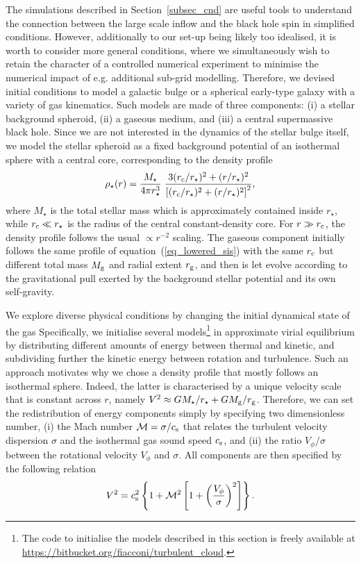 \documentclass[a4paper,fleqn,usenatbib]{mnras}
\begin{document}

The simulations described in Section~\ref{subsec_cnd} are useful tools to understand the connection between the large scale inflow and the black hole spin in simplified conditions.
However, additionally to our set-up being likely too idealised, it is worth to consider more general conditions, where we simultaneously wish to retain the character of a controlled numerical experiment to minimise the numerical impact of e.g. additional sub-grid modelling.
Therefore, we devised initial conditions to model a galactic bulge or a spherical early-type galaxy with a variety of gas kinematics. 
Such models are made of three components: (i) a stellar background spheroid, (ii) a gaseous medium, and (iii) a central supermassive black hole.
Since we are not interested in the dynamics of the stellar bulge itself, we model the stellar spheroid as a fixed background potential of an isothermal sphere with a central core, corresponding to the density profile
\begin{equation}\label{eq_lowered_sis}
\rho_{\star}(r) = \frac{M_{\star}}{4 \pi r_{\star}^3}~\frac{3 (r_{\rm c}/r_{\star})^2 + (r/r_{\star})^2}{\left[(r_{\rm c}/r_{\star})^2 + (r/r_{\star})^2 \right]^2},
\end{equation}
where $M_{\star}$ is the total stellar mass which is approximately contained inside $r_{\star}$, while $r_{\rm c} \ll r_{\star}$ is the radius of the central constant-density core.
For $r \gg r_{\rm c}$, the density profile follows the usual $\propto r^{-2}$ scaling.
The gaseous component initially follows the same profile of equation~(\ref{eq_lowered_sis}) with the same $r_{\rm c}$ but different total mass $M_{\rm g}$ and radial extent $r_{\rm g}$, and then is let evolve according to the gravitational pull exerted by the background stellar potential and its own self-gravity.

We explore diverse physical conditions by changing the initial dynamical state of the gas
Specifically, we initialise several models\footnote{The code to initialise the models described in this section is freely available at \url{https://bitbucket.org/fiacconi/turbulent_cloud}.} in approximate virial equilibrium by distributing different amounts of energy between thermal and kinetic, and subdividing further the kinetic energy between rotation and turbulence.
Such an approach motivates why we chose a density profile that mostly follows an isothermal sphere.
Indeed, the latter is characterised by a unique velocity scale that is constant across $r$, namely $V^2 \approx GM_{\star}/r_{\star} + G M_{\rm g}/r_{\rm g}$.
Therefore, we can set the redistribution of energy components simply by specifying two dimensionless number, (i) the Mach number $\mathcal{M} = \sigma / c_{\rm s}$ that relates the turbulent velocity dispersion $\sigma$ and the isothermal gas sound speed $c_{\rm s}$, and (ii) the ratio $V_{\phi} / \sigma$ between the rotational velocity $V_{\phi}$ and $\sigma$.
All components are then specified by the following relation
\begin{equation}\label{eq_sis_velscale}
V^2 = c_{\rm s}^2 \left\{ 1 + \mathcal{M}^2 \left[ 1 + \left( \frac{V_{\phi}}{\sigma} \right)^2 \right] \right\}.
\end{equation}
\end{document}
